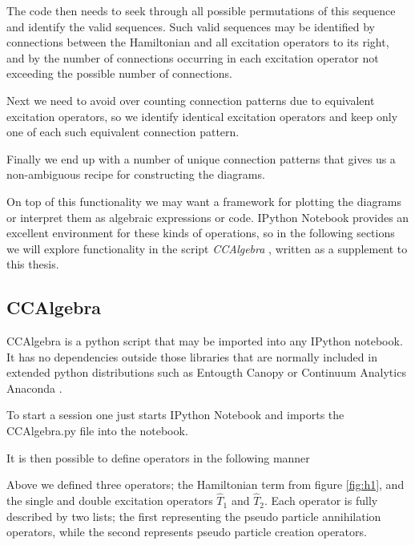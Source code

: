 The code then needs to seek through all possible permutations of this sequence and identify the valid sequences. Such valid sequences may be identified by connections between the Hamiltonian and all excitation operators to its right, and by the number of connections occurring in each excitation operator not exceeding the possible number of connections.

Next we need to avoid over counting connection patterns due to equivalent excitation operators, so we identify identical excitation operators and keep only one of each such equivalent connection pattern.

Finally we end up with a number of unique connection patterns that gives us a non-ambiguous recipe for constructing the diagrams.

On top of this functionality we may want a framework for plotting the diagrams or interpret them as algebraic expressions or code. IPython Notebook \cite{ipython} provides an excellent environment for these kinds of operations, so in the following sections we will explore functionality in the script \emph{CCAlgebra} \cite{CCAlgebra}, written as a supplement to this thesis.

\subsection{CCAlgebra}

CCAlgebra is a python script that may be imported into any IPython notebook. It has no dependencies outside those libraries that are normally included in extended python distributions such as Entougth Canopy \cite{Entougth} or Continuum Analytics Anaconda \cite{Anaconda}. 

To start a session one just starts IPython Notebook and imports the CCAlgebra.py file into the notebook.

It is then possible to define operators in the following manner

\begin{minipage}{\linewidth}
\end{minipage}

Above we defined three operators; the Hamiltonian term from figure \ref{fig:h1}, and the single and double excitation operators $\hat{T}_1$ and $\hat{T}_2$. Each operator is fully described by two lists; the first representing the pseudo particle annihilation operators, while the second represents pseudo particle creation operators. 

